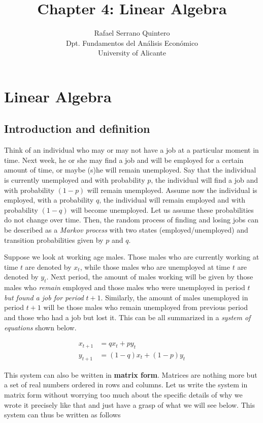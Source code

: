 \documentclass[a4paper,11pt]{article}
\title{Chapter 4: Linear Algebra}
\author{Rafael Serrano Quintero \\
Dpt. Fundamentos del An\'alisis Econ\'omico \\
University of Alicante}
\date{}
\theoremstyle{definition}
\theoremstyle{plain}
\begin{document}
      

\maketitle

\section{Linear Algebra}\label{linear-algebra}

\subsection{Introduction and
definition}\label{introduction-and-definition}

Think of an individual who may or may not have a job at a particular
moment in time. Next week, he or she may find a job and will be employed
for a certain amount of time, or maybe (s)he will remain unemployed. Say
that the individual is currently unemployed and with probability \(p\),
the individual will find a job and with probability \((1-p)\) will
remain unemployed. Assume now the individual is employed, with a
probability \(q\), the individual will remain employed and with
probability \((1-q)\) will become unemployed. Let us assume these
probabilities do not change over time. Then, the random process of
finding and losing jobs can be described as a \emph{Markov process} with
two states (employed/unemployed) and transition probabilities given by
\(p\) and \(q\).

Suppose we look at working age males. Those males who are currently
working at time \(t\) are denoted by \(x_t\), while those males who are
unemployed at time \(t\) are denoted by \(y_t\). Next period, the amount
of males working will be given by those males who \emph{remain} employed
and those males who were unemployed in period \(t\) \emph{but found a
job for period} \(t+1\). Similarly, the amount of males unemployed in
period \(t+1\) will be those males who remain unemployed from previous
period and those who had a job but lost it. This can be all summarized
in a \emph{system of equations} shown below.

\begin{align*}
x_{t+1} & = q x_t + p y_t \\
y_{t+1} & = (1-q) x_t + (1-p)y_t
\end{align*}

This system can also be written in \textbf{matrix form}. Matrices are
nothing more but a set of real numbers ordered in rows and columns. Let
us write the system in matrix form without worrying too much about the
specific details of why we wrote it precisely like that and just have a
grasp of what we will see below. This system can thus be written as
follows
\end{document}

